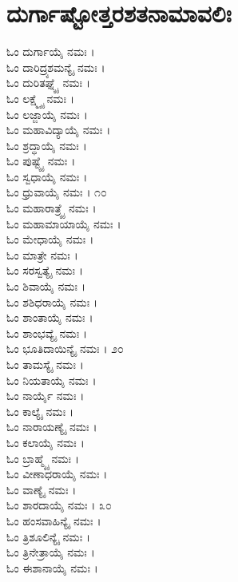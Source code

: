 \section{ದುರ್ಗಾಷ್ಟೋತ್ತರಶತನಾಮಾವಲಿಃ}
\begin{multicols}{2}
ಓಂ ದುರ್ಗಾಯೈ ನಮಃ ।\\
ಓಂ ದಾರಿದ್ರ್ಯಶಮನ್ಯೈ ನಮಃ ।\\
ಓಂ ದುರಿತಘ್ನ್ಯೈ ನಮಃ ।\\
ಓಂ ಲಕ್ಷ್ಮ್ಯೈ ನಮಃ ।\\
ಓಂ ಲಜ್ಜಾಯೈ ನಮಃ ।\\
ಓಂ ಮಹಾವಿದ್ಯಾಯೈ ನಮಃ ।\\
ಓಂ ಶ್ರದ್ಧಾಯೈ ನಮಃ ।\\
ಓಂ ಪುಷ್ಟ್ಯೈ ನಮಃ ।\\
ಓಂ ಸ್ವಧಾಯೈ ನಮಃ ।\\
ಓಂ ಧ್ರುವಾಯೈ ನಮಃ । ೧೦\\
ಓಂ ಮಹಾರಾತ್ರ್ಯೈ ನಮಃ ।\\
ಓಂ ಮಹಾಮಾಯಾಯೈ ನಮಃ ।\\
ಓಂ ಮೇಧಾಯೈ ನಮಃ ।\\
ಓಂ ಮಾತ್ರೇ ನಮಃ ।\\
ಓಂ ಸರಸ್ವತ್ಯೈ ನಮಃ ।\\
ಓಂ ಶಿವಾಯೈ ನಮಃ ।\\
ಓಂ ಶಶಿಧರಾಯೈ ನಮಃ ।\\
ಓಂ ಶಾಂತಾಯೈ ನಮಃ ।\\
ಓಂ ಶಾಂಭವ್ಯೈ ನಮಃ ।\\
ಓಂ ಭೂತಿದಾಯಿನ್ಯೈ ನಮಃ । ೨೦\\
ಓಂ ತಾಮಸ್ಯೈ ನಮಃ ।\\
ಓಂ ನಿಯತಾಯೈ ನಮಃ ।\\
ಓಂ ನಾರ್ಯೈ ನಮಃ ।\\
ಓಂ ಕಾಲ್ಯೈ ನಮಃ ।\\
ಓಂ ನಾರಾಯಣ್ಯೈ ನಮಃ ।\\
ಓಂ ಕಲಾಯೈ ನಮಃ ।\\
ಓಂ ಬ್ರಾಹ್ಮ್ಯೈ ನಮಃ ।\\
ಓಂ ವೀಣಾಧರಾಯೈ ನಮಃ ।\\
ಓಂ ವಾಣ್ಯೈ ನಮಃ ।\\
ಓಂ ಶಾರದಾಯೈ ನಮಃ । ೩೦\\
ಓಂ ಹಂಸವಾಹಿನ್ಯೈ ನಮಃ ।\\
ಓಂ ತ್ರಿಶೂಲಿನ್ಯೈ ನಮಃ ।\\
ಓಂ ತ್ರಿನೇತ್ರಾಯೈ ನಮಃ ।\\
ಓಂ ಈಶಾನಾಯೈ ನಮಃ ।\\

\end{multicols}
